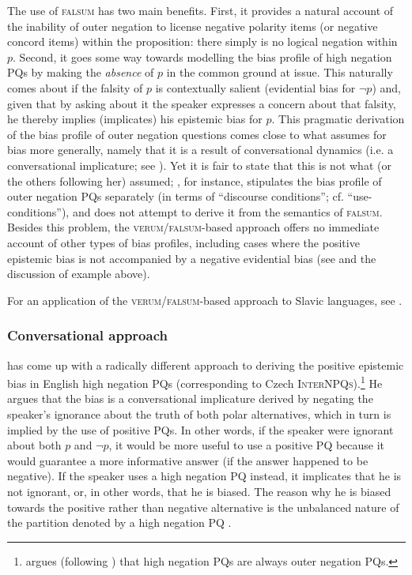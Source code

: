 \documentclass[output=paper,colorlinks,citecolor=brown]{langscibook}
\begin{document}
\noindent The use of \textsc{falsum} has two main benefits. First, it provides a natural account of the inability of outer negation to license negative polarity items (or negative concord items) within the proposition: there simply is no logical negation within $p$. Second, it goes some way towards modelling the bias profile of high negation PQs by making the \textit{absence} of $p$ in the common ground at issue. This naturally comes about if the falsity of $p$ is contextually salient (evidential bias for $\neg p$) and, given that by asking about it the speaker expresses a concern about that falsity, he thereby implies (implicates) his epistemic bias for $p$. This pragmatic derivation of the bias profile of outer negation questions comes close to what \citet{Goodhue2022} assumes for bias more generally, namely that it is a result of conversational dynamics (i.e. a conversational implicature; see ). Yet it is fair to state that this is not what \citeauthor{Repp2009} (or the others following her) assumed; \citet[243]{Repp2013}, for instance, stipulates the bias profile of outer negation PQs separately (in terms of ``discourse conditions''; cf.  ``use-conditions''), and does not attempt to derive it from the semantics of \textsc{falsum}. Besides this problem, the \textsc{verum/falsum}-based approach offers no immediate account of other types of bias profiles, including cases where the positive epistemic bias is not accompanied by a negative evidential bias (see \citealt{Goodhue2022} and the discussion of example  above).

For an application of the \textsc{verum/falsum}-based approach to Slavic languages, see \citet{Stankova2023,Repp.Geist2025}.

\subsubsection{Conversational approach}\label{sim:sec:goodhue}

\citet{Goodhue2022} has come up with a radically different approach to deriving the positive epistemic bias in English high negation PQs (corresponding to Czech \textsc{InterNPQs}).\footnote{\citet{Goodhue2022} argues (following \citealt{Sailor2013,AnderBois2019}) that high negation PQs are always outer negation PQs.} He argues that the bias is a conversational implicature derived by negating the speaker's ignorance about the truth of both polar alternatives, which in turn is implied by the use of positive PQs. In other words, if the speaker were ignorant about both $p$ and $\neg p$, it would be more useful to use a positive PQ because it would guarantee a more informative answer (if the answer happened to be negative). If the speaker uses a high negation PQ instead, it implicates that he is not ignorant, or, in other words, that he is biased. The reason why he is biased towards the positive rather than negative alternative is the unbalanced nature of the partition denoted by a high negation PQ \citep{Romero.Han2004,Krifka2017}.
\end{document}
